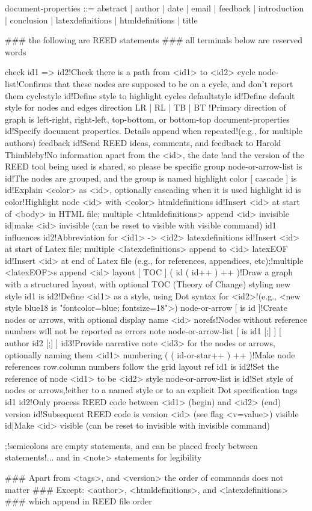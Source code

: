 document-properties ::=  abstract | author | date | email
                       | feedback | introduction | conclusion 
                       | latexdefinitions | htmldefinitions | title 

### the following are REED statements
### all terminals below are reserved words

check id1 => id2!Check there is a path from <id1> to <id2>
cycle node-list!Confirms that these nodes are supposed to be on a cycle, and don't report them
cyclestyle id!Define style to highlight cycles
defaultstyle id!Define default style for nodes and edges
direction { LR | RL | TB | BT }!Primary direction of graph is left-right, right-left, top-bottom, or bottom-top
document-properties id!Specify document properties. Details append when repeated!(e.g., for multiple authors)
feedback id!Send REED ideas, comments, and feedback to Harold Thimbleby!No information apart from the <id>, the date !and the version of the REED tool being used is shared, so please be specific
group node-or-arrow-list is id!The nodes are grouped, and the group is named
highlight color [ cascade ] is id!Explain <color> as <id>, optionally cascading when it is used
highlight id is color!Highlight node <id> with <color>
htmldefinitions id!Insert <id> at start of <body> in HTML file; multiple <htmldefinitions> append <id>
invisible id|make <id> invisible (can be reset to visible with visible command)
id1 influences id2!Abbreviation for <id1> -> <id2>
latexdefinitions id!Insert <id> at start of Latex file; multiple <latexdefinitions> append to <id> 
latexEOF id!Insert <id> at end of Latex file (e.g., for references, appendices, etc);!multiple <latexEOF>s append <id> 
layout [ TOC ] ( { id ( id++ ) }++ )!Draw a graph with a structured layout, with optional TOC (Theory of Change) styling
new style id1 is id2!Define <id1> as a style, using Dot syntax for <id2>!(e.g., <new style blue18 is "fontcolor=blue; fontsize=18">)
node-or-arrow [ is id ]!Create nodes or arrows, with optional display name <id>
norefs!Nodes without reference numbers will not be reported as errors
note node-or-arrow-list [ is id1 [;] ] [ author id2 [;] ] id3!Provide narrative note <id3> for the nodes or arrows, optionally naming them <id1>
numbering ( { ( id-or-star++ ) }++ )!Make node references row.column numbers follow the grid layout
ref id1 is id2!Set the reference of node <id1> to be <id2>
style node-or-arrow-list is id!Set style of nodes or arrows,!either to a named style or to an explicit Dot specification
tags id1 id2!Only process REED code between <id1> (begin) and <id2> (end)
version id!Subsequent REED code is version <id> (see flag <v=value>)
visible id|Make <id> visible (can be reset to invisible with invisible command)


;!semicolons are empty statements, and can be placed freely between statements!... and in <note> statements for legibility

### Apart from <tags>, and <version> the order of commands does not matter
### Except: <author>, <htmldefinitions>, and <latexdefinitions>
### which append in REED file order


